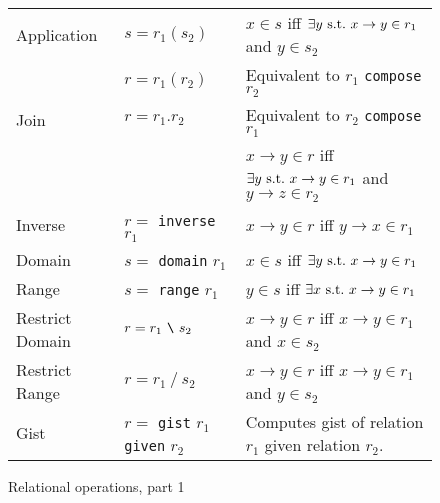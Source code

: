 \begin{figure}[tbp]
\begin{tabular}{l|l|p{3.5in}}
Application &
$s = r_1 (s_2)$ &
$x \in s$ iff $\exists y {\rm \ s.t.\ } x \rightarrow y \in r_1$
and $ y \in s_2$
\\


&
$r = r_1 (r_2)$ &
Equivalent to $r_1$ {\tt compose} $r_2$ \\

Join &
$ r = r_1 . r_2 $
& Equivalent to $r_2$ {\tt compose} $r_1$\\
& & $x \rightarrow y \in r$ iff $\exists y {\rm \ s.t.\ } x \rightarrow y \in r_1$
and $ y \rightarrow z \in r_2$
\\



Inverse &
$r =$ {\tt inverse} $r_1$ &
$x \rightarrow y \in r $ iff $y \rightarrow x \in r_1$\\

Domain &
$s =$ {\tt domain} $r_1$ 
& $x \in s$ iff $\exists y {\rm \ s.t.\ } x \rightarrow y \in r_1$\\

Range &
$s =$ {\tt range} $r_1$ 
& $y \in s$ iff $\exists x {\rm \ s.t.\ } x \rightarrow y \in r_1$\\

Restrict Domain &
$r = r_1 ~\verb+\+~ s_2$ 
& $x \rightarrow y \in r$ iff $x \rightarrow y \in r_1$ and $x \in s_2$
\\

Restrict Range &
$r = r_1 ~/~ s_2$ 
& $x \rightarrow y \in r$ iff $x \rightarrow y \in r_1$ and $y \in s_2$
\\

Gist &
$r=$ {\tt gist} $r_1$ {\tt given} $r_2$ &
Computes gist of relation $r_1$ given relation $r_2$. \\


\end{tabular}
\caption{Relational operations, part 1}
\label{RelOps1}
\end{figure}


